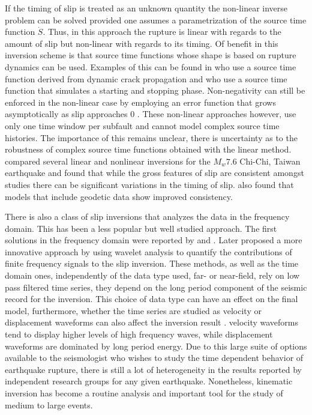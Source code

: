 If the timing of slip is treated as an unknown quantity the non-linear inverse problem can be solved provided one assumes a parametrization of the source time function $\dot{S}$. Thus, in this approach the rupture is linear with regards to the amount of slip but non-linear with regards to its timing. Of benefit in this inversion scheme is that source time functions whose shape is based on rupture dynamics can be used. Examples of this can be found in \citet{beroza1988} who use a source time function derived from dynamic crack propagation and \citet{ji2003} who use a source time function that simulates a starting and stopping phase. Non-negativity can still be enforced in the non-linear case by employing an error function that grows asymptotically as slip approaches 0 \citep{yoshida1990}. These non-linear approaches however, use only one time window per subfault and cannot model complex source time histories. The importance of this remains unclear, there is uncertainty as to the robustness of complex source time functions obtained with the linear method. \citet{ide2007} compared several linear and nonlinear inversions for the $M_w7.6$ Chi-Chi, Taiwan earthquake and found that while the gross features of slip are consistent amongst studies there can be significant variations in the timing of slip. \citet{ide2007} also found that models that include geodetic data show improved consistency.

There is also a class of slip inversions that analyzes the data in the frequency domain. This has been a less popular but well studied approach. The first solutions in the frequency domain were reported by \citet{olson1988} and \citet{cotton1995}. Later \citet{ji2002} proposed a more innovative approach by using wavelet analysis to quantify the contributions of finite frequency signals to the slip inversion. These methods, as well as the time domain ones, independently of the data type used, far- or near-field, rely on low pass filtered time series, they depend on the long period component of the seismic record for the inversion. This choice of data type can have an effect on the final model, furthermore, whether the time series are studied as velocity or displacement waveforms can also affect the inversion result \citep{ide2007}. velocity waveforms tend to display higher levels of high frequency waves, while displacement waveforms are dominated by long period energy. Due to this large suite of options available to the seismologist who wishes to study the time dependent behavior of earthquake rupture, there is still a lot of heterogeneity in the results reported by independent research groups for any given earthquake. Nonetheless, kinematic inversion has become a routine analysis and important tool for the study of medium to large events.

